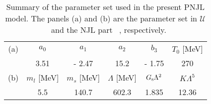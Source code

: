 \documentclass[prd,superscriptaddress,unsortedaddress,
twocolumn,showpacs,preprintnumbers,amsmath,amssymb]{revtex4}
\begin{document}
 \begin{table}[t]
\begin{center}
\caption{
 Summary of the parameter set used in the present PNJL model.
 The panels (a) and (b) are the parameter set
 in $\mathcal{U}$~\cite{Rossner} and the NJL part
 ~\cite{Reinberg_Klevansky_Hufner, Klevansky_review},
 respectively.
   }
\begin{tabular}{c|ccccc}
\hline \hline
 (a) & $a_{0}$ & $a_{1}$ & $a_{2}$ & $b_{3}$ & $T_{0}$ [MeV] \\
 & 3.51 & - 2.47 & 15.2 & - 1.75 & 270 \\ \hline
 (b) & $m_{l}$ [MeV] & $m_{s}$ [MeV] & $\Lambda$ [MeV] & $G_{\rm s}\Lambda^2$
             & $K\Lambda^5$ \\
       & 5.5 & 140.7 & 602.3 & 1.835 & 12.36 \\ \hline \hline
\end{tabular}
\label{table1}
\end{center}
 \end{table}
 
\end{document}

